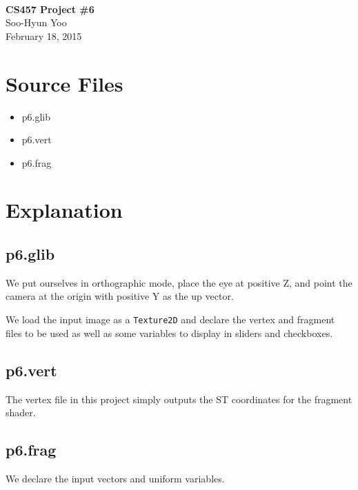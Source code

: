 \documentclass[12pt,letterpaper]{article}
\begin{document}
\fancyfoot{}
\begin{center}
    \hfill \\
    \vspace{4in}
    {\bf\Huge CS457 Project \#6 \\}
    \vspace{2in}
    {\Large Soo-Hyun Yoo \\ February 18, 2015}
\end{center}

\newpage
{}

\section*{Source Files}

\begin{itemize}
    \item p6.glib
    \item p6.vert
    \item p6.frag
\end{itemize}


\section*{Explanation}

\subsection*{p6.glib}

We put ourselves in orthographic mode, place the eye at positive Z, and point
the camera at the origin with positive Y as the up vector.

We load the input image as a {\tt Texture2D} and declare the vertex and
fragment files to be used as well as some variables to display in sliders and
checkboxes.

\subsection*{p6.vert}

The vertex file in this project simply outputs the ST coordinates for the
fragment shader.

\subsection*{p6.frag}

We declare the input vectors and uniform variables.
\end{document}
